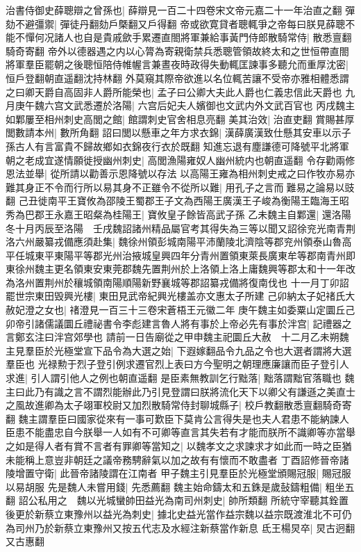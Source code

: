 治書侍御史薛聰辯之曾孫也|{
	薛辯見一百二十四卷宋文帝元嘉二十一年治直之翻}
彈劾不避彊禦|{
	彈徒丹翻劾戶槩翻又戶得翻}
帝或欲寛貸者聰輒爭之帝每曰朕見薛聰不能不憚何况諸人也自是貴戚歛手累遷直閤將軍兼給事黃門侍郎散騎常侍|{
	散悉亶翻騎奇寄翻}
帝外以德器遇之内以心膂為寄親衛禁兵悉聰管領故終太和之世恒帶直閤將軍羣臣罷朝之後聰恒陪侍帷幄言兼晝夜時政得失動輒匡諫事多聽允而重厚沈密|{
	恒戶登翻朝直遥翻沈持林翻}
外莫窺其際帝欲進以名位輒苦讓不受帝亦雅相體悉謂之曰卿天爵自高固非人爵所能榮也|{
	孟子曰公卿大夫此人爵也仁義忠信此天爵也}
九月庚午魏六宫文武悉遷於洛陽|{
	六宫后妃夫人嬪御也文武内外文武百官也}
丙戌魏主如鄴屢至相州刺史高閭之館|{
	館謂刺史官舍相息亮翻}
美其治效|{
	治直吏翻}
賞賜甚厚閭數請本州|{
	數所角翻}
詔曰閭以懸車之年方求衣錦|{
	漢薛廣漢致仕懸其安車以示子孫古人有言富貴不歸故鄉如衣錦夜行衣於既翻}
知進忘退有塵謙德可降號平北將軍朝之老成宜遂情願徙授幽州刺史|{
	高閭漁陽雍奴人幽州統内也朝直遥翻}
令存勸兩修恩法並舉|{
	從所請以勸善示恩降號以存法}
以高陽王雍為相州刺史戒之曰作牧亦易亦難其身正不令而行所以易其身不正雖令不從所以難|{
	用孔子之言而難易之論易以豉翻}
己丑徙南平王寶攸為邵陵王蜀郡王子文為西陽王廣漢王子峻為衡陽王臨海王昭秀為巴郡王永嘉王昭粲為桂陽王|{
	寶攸皇子餘皆高武子孫}
乙未魏主自鄴還|{
	還洛陽}
冬十月丙辰至洛陽　壬戌魏詔諸州精品屬官考其得失為三等以聞又詔徐兖光南青荆洛六州嚴纂戎備應須赴集|{
	魏徐州領彭城南陽平沛蘭陵北濟陰等郡兖州領泰山魯高平任城東平東陽平等郡光州治掖城皇興四年分青州置領東萊長廣東牟等郡南青州即東徐州魏主更名領東安東莞郡魏先置荆州於上洛領上洛上庸魏興等郡太和十一年改為洛州置荆州於穰城領南陽順陽新野襄城等郡詔纂戎備將復南伐也}
十一月丁卯詔罷世宗東田毁興光樓|{
	東田見武帝紀興光樓盖亦文惠太子所建}
己卯納太子妃禇氏大赦妃澄之女也|{
	禇澄見一百三十三卷宋蒼梧王元徽二年}
庚午魏主如委粟山定圜丘己卯帝引諸儒議圜丘禮祕書令李彪建言魯人將有事於上帝必先有事於泮宫|{
	記禮器之言鄭玄注曰泮宫郊學也}
請前一日告廟從之甲申魏主祀圜丘大赦　十二月乙未朔魏主見羣臣於光極堂宣下品令為大選之始|{
	下遐嫁翻品令九品之令也大選者謂將大選羣臣也}
光禄勲于烈子登引例求遷官烈上表曰方今聖明之朝理應廉讓而臣子登引人求進|{
	引人謂引他人之例也朝直遥翻}
是臣素無教訓乞行黜落|{
	黜落謂黜官落職也}
魏主曰此乃有識之言不謂烈能辦此乃引見登謂曰朕將流化天下以卿父有謙遜之美直士之風故進卿為太子翊軍校尉又加烈散騎常侍封聊城縣子|{
	校戶教翻散悉亶翻騎奇寄翻}
魏主謂羣臣曰國家從來有一事可歎臣下莫肯公言得失是也夫人君患不能納諫人臣患不能盡忠自今朕舉一人如有不可卿等直言其失若有才能而朕所不識卿等亦當舉之如是得人者有賞不言者有罪卿等當知之|{
	以魏孝文之求諫求才如此而一時之臣猶未能稱上意豈非朝廷之議帝務騁辭氣以加之故有有懷而不敢盡者}
丁酉詔修晉帝諸陵增置守衛|{
	此晉帝諸陵謂在江南者}
甲子魏主引見羣臣於光極堂頒賜冠服|{
	賜冠服以易胡服}
先是魏人未嘗用錢|{
	先悉薦翻}
魏主始命鑄太和五銖是歲鼔鑄粗備|{
	粗坐五翻}
詔公私用之　魏以光城蠻帥田益光為南司州刺史|{
	帥所類翻}
所統守宰聽其銓置後更於新蔡立東豫州以益光為刺史|{
	據北史益光當作益宗魏以益宗既渡淮北不可仍為司州乃於新蔡立東豫州又按五代志及水經注新蔡當作新息}
氐王楊炅卒|{
	炅古迥翻又古惠翻}


